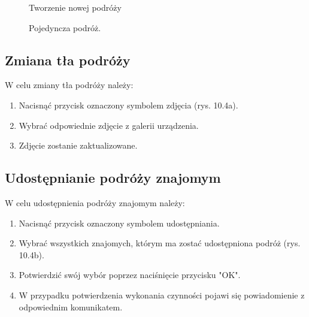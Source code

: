 \begin{figure}[h]
\centering
\null\hfill
{}
\hfill
{}
\hfill
{}
\hfill\null

\caption{Tworzenie nowej podróży}
\label{fig:podrecznik2}
\end{figure}
\FloatBarrier

\begin{figure}[h]
\centering

\centering
\null\hfill
{}
\hfill
{}
\hfill\null

\caption{Pojedyncza podróż.}
\label{fig:podrecznik3}
\end{figure}
\FloatBarrier

\subsection{Zmiana tła podróży}

W celu zmiany tła podróży należy:
\begin{enumerate}
\item Nacisnąć przycisk oznaczony symbolem zdjęcia (rys. 10.4a).
\item Wybrać odpowiednie zdjęcie z galerii urządzenia.
\item Zdjęcie zostanie zaktualizowane.
\end{enumerate}

\subsection{Udostępnianie podróży znajomym}

W celu udostępnienia podróży znajomym należy:
\begin{enumerate}
\item Nacisnąć przycisk oznaczony symbolem udostępniania.
\item Wybrać wszystkich znajomych, którym ma zostać udostępniona podróż (rys. 10.4b).
\item Potwierdzić swój wybór poprzez naciśnięcie przycisku "OK".
\item W przypadku potwierdzenia wykonania czynności pojawi się powiadomienie z odpowiednim komunikatem.
\end{enumerate}

